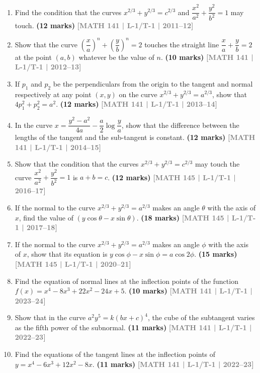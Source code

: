 \documentclass[12pt,a4paper]{article}
\newcommand{\yr}[1]{\hfill\textcolor{gray}{\small\textbf{[#1]}}}
\newcommand{\mk}[1]{\textcolor{orange!70!black}{\small\textbf{(#1 marks)}}}
\begin{document}
\begin{enumerate}
\item Find the condition that the curves $x^{2/3}+y^{2/3}=c^{2/3}$ and $\dfrac{x^{2}}{a^{2}}+\dfrac{y^{2}}{b^{2}}=1$ may touch.
\mk{12} \yr{MATH 141 | L-1/T-1 | 2011--12}

\item Show that the curve $\left(\dfrac{x}{a}\right)^{n}+\left(\dfrac{y}{b}\right)^{n}=2$ touches the straight line $\dfrac{x}{a}+\dfrac{y}{b}=2$ at the point $(a,b)$ whatever be the value of $n$.
\mk{10} \yr{MATH 141 | L-1/T-1 | 2012--13}

\item If $p_{1}$ and $p_{2}$ be the perpendiculars from the origin to the tangent and normal respectively at any point $(x,y)$ on the curve $x^{2/3}+y^{2/3}=a^{2/3}$, show that $4p_{1}^{2}+p_{2}^{2}=a^{2}$.
\mk{12} \yr{MATH 141 | L-1/T-1 | 2013--14}

\item In the curve $x=\dfrac{y^{2}-a^{2}}{4a}-\dfrac{a}{2}\log\dfrac{y}{a}$, show that the difference between the lengths of the tangent and the sub-tangent is constant.
\mk{12} \yr{MATH 141 | L-1/T-1 | 2014--15}

\item Show that the condition that the curves $x^{2/3}+y^{2/3}=c^{2/3}$ may touch the curve $\dfrac{x^{2}}{a^{2}}+\dfrac{y^{2}}{b^{2}}=1$ is $a+b=c$.
\mk{12} \yr{MATH 145 | L-1/T-1 | 2016--17}

\item If the normal to the curve $x^{2/3}+y^{2/3}=a^{2/3}$ makes an angle $\theta$ with the axis of $x$, find the value of $(y\cos\theta-x\sin\theta)$.
\mk{18} \yr{MATH 145 | L-1/T-1 | 2017--18}

\item If the normal to the curve $x^{2/3}+y^{2/3}=a^{2/3}$ makes an angle $\phi$ with the axis of $x$, show that its equation is $y\cos\phi-x\sin\phi=a\cos 2\phi$.
\mk{15} \yr{MATH 145 | L-1/T-1 | 2020--21}

\item Find the equation of normal lines at the inflection points of the function $f(x)=x^{4}-8x^{3}+22x^{2}-24x+5$.
\mk{10} \yr{MATH 141 | L-1/T-1 | 2023--24}

\item Show that in the curve $a^{2}y^{5}=k(bx+c)^{4}$, the cube of the subtangent varies as the fifth power of the subnormal.
\mk{11} \yr{MATH 141 | L-1/T-1 | 2022--23}

\item Find the equations of the tangent lines at the inflection points of $y=x^{4}-6x^{3}+12x^{2}-8x$.
\mk{11} \yr{MATH 141 | L-1/T-1 | 2022--23}



\end{enumerate}
\end{document}
